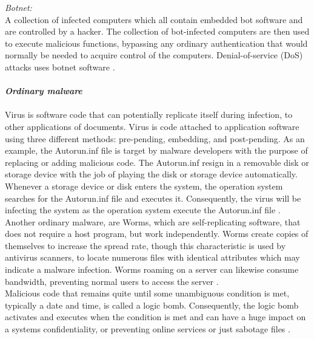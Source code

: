 \documentclass[12pt]{article} %
\begin{document}
\emph{Botnet:} \\
A collection of infected computers which all contain embedded bot software and are controlled by a hacker. The collection of bot-infected computers are then used to execute malicious functions, bypassing any ordinary authentication that would normally be needed to acquire control of the computers. Denial-of-service (DoS) attacks uses botnet software \cite{Asurveyonmalware}.  
\\ \\
\textbf{\emph{Ordinary malware}}
\\ \\
Virus is software code that can potentially replicate itself during infection, to other applications of documents. Virus is code attached to application software using three different methods: pre-pending, embedding, and post-pending. As an example, the Autorun.inf file is target by malware developers with the purpose of replacing or adding malicious code. The Autorun.inf resign in a removable disk or storage device with the job of playing the disk or storage device automatically. Whenever a storage device or disk enters the system, the operation system searches for the Autorun.inf file and executes it. Consequently, the virus will be infecting the system as the operation system execute the Autorun.inf file \cite{Asurveyonmalware}.  Another ordinary malware, are Worms, which are self-replicating software, that does not require a host program, but work independently. Worms create copies of themselves to increase the spread rate, though this characteristic is used by antivirus scanners, to locate numerous files with identical attributes which may indicate a malware infection. Worms roaming on a server can likewise consume bandwidth, preventing normal users to access the  server \cite{Asurveyonmalware}. \\
Malicious code that remains quite until some unambiguous condition is met, typically a date and time, is called a logic bomb. Consequently, the logic bomb activates and executes when the condition is met and can have a huge impact on a systems confidentiality, or preventing online services or just sabotage files \cite{Asurveyonmalware}.  
\\
\end{document}
